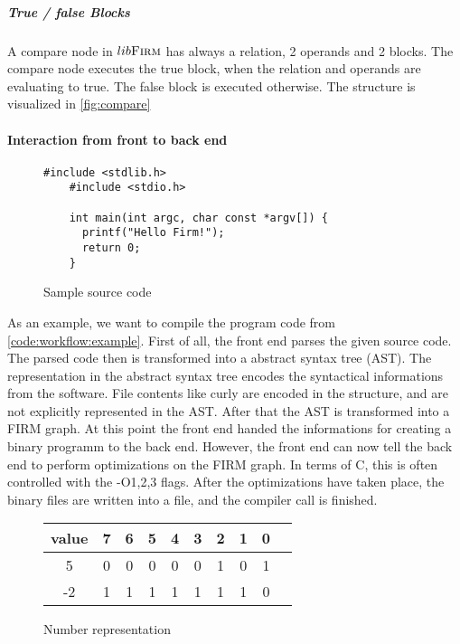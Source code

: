 \subparagraph{True / false Blocks}

A compare node in $lib\textsc{Firm}$ has always a relation, 2 operands and 2 blocks. The compare node executes the true block, when the relation and operands are evaluating to true. The false block is executed otherwise. The structure is visualized in \autoref{fig:compare}

\paragraph{Interaction from front to back end}

\begin{figure}
	\centering
	\begin{lstlisting}[frame=single]
	#include <stdlib.h>
	#include <stdio.h>
	
	int main(int argc, char const *argv[]) {
	  printf("Hello Firm!");
	  return 0;
	}
	\end{lstlisting} 
	\caption{Sample source code}
	\label{code:workflow:example}
\end{figure}

As an example, we want to compile the program code from \autoref{code:workflow:example}.
First of all, the front end parses the given source code. The parsed code then is transformed into a abstract syntax tree (AST). The representation in the abstract syntax tree encodes the syntactical informations from the software. File contents like curly are encoded in the structure, and are not explicitly represented in the AST. \newline
After that the AST is transformed into a FIRM graph. \newline
At this point the front end handed the informations for creating a binary programm to the back end. However, the front end can now tell the back end to perform optimizations on the FIRM graph. In terms of C, this is often controlled with the -O{1,2,3} flags. \newline
After the optimizations have taken place, the binary files are written into a file, and the compiler call is finished.
\begin{figure}
	\centering
	\begin{tabular}{c | c c c c c c c c c}
		value & 7 & 6 & 5 & 4 & 3 & 2 & 1 & 0 \\
		\hline
		5     & 0 & 0 & 0 & 0 & 0 & 1 & 0 & 1 \\
		-2    & 1 & 1 & 1 & 1 & 1 & 1 & 1 & 0 \\
	\end{tabular}
	\caption{Number representation}
	\label{fig:numbers}
\end{figure}

